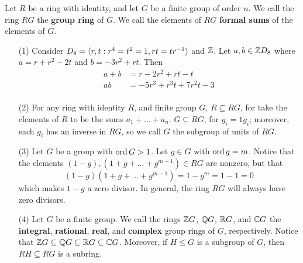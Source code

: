 \begin{definition}
    Let $R$ be a ring with identity, and let  $G$ be a finite group of order
    $n$. We call the ring $RG$ the \textbf{group ring} of $G$. We call the
    elements of  $RG$  \textbf{formal sums} of the elements of $G$.
\end{definition}

\begin{example}\label{1.8}
    \begin{enumerate}
        \item[(1)] Consider $D_8=\langle r,t : r^4=t^2=1, rt=tr^{-1} \rangle$
            and $\mathbb{Z}$. Let $a,b \in \mathbb{Z}{D_8}$ where $a=r+r^2-2t$ and  $b=-3r^2+rt$.
            Then
            \begin{align*}
                a+b &=  r-2r^2+rt-t \\
                ab  &=  -5r^3+r^3t+7r^2t-3  \\
            \end{align*}

        \item[(2)] For any ring with identity $R$, and finite group $G$, $R
            \subseteq RG$, for take the elements of  $R$ to be the sums
            $a_1+\dots+a_n$. $G \subseteq RG$, for  $g_i=1g_i$; moreover, each
            $g_i$ has an inverse in  $RG$, so we call  $G$ the subgroup of units
            of $RG$.

        \item[(3)] Let $G$ be a group with $\operatorname{ord}{G}>1$. Let $g \in G$ with
            $\operatorname{ord}{g}=m$. Notice that the elements $(1-g),(1+g+\dots+g^{m-1}) \in
            RG$ are nonzero, but that
            \begin{equation*}
                (1-g)(1+g+\dots+g^{m-1})=1-g^m=1-1=0
            \end{equation*}
            which makes $1-g$ a zero divisor. In general, the ring $RG$ will
            always have zero divisors.

        \item[(4)] Let $G$ be a finite group. We call the rings  $\mathbb{Z}{G}$,
            $\mathbb{Q}{G}$, $\mathbb{R}{G}$, and $\mathbb{C}{G}$ the \textbf{integral},
            \textbf{rational}, \textbf{real}, and \textbf{complex} group rings
            of $G$, respectively. Notice that $\mathbb{Z}{G} \subseteq \mathbb{Q}{G} \subseteq
            \mathbb{R}{G} \subseteq \mathbb{C}{G}$. Moreover, if $H \leq G$ is a subgroup of
            $G$, then  $RH \subseteq RG$ is a subring.
    \end{enumerate}
\end{example}
